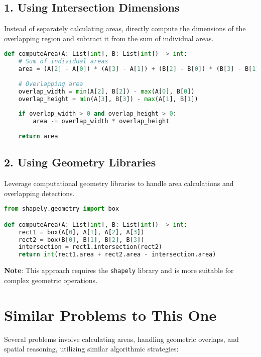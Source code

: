 \subsection*{1. Using Intersection Dimensions}

Instead of separately calculating areas, directly compute the dimensions of the overlapping region and subtract it from the sum of individual areas.

\begin{lstlisting}[language=Python]
def computeArea(A: List[int], B: List[int]) -> int:
    # Sum of individual areas
    area = (A[2] - A[0]) * (A[3] - A[1]) + (B[2] - B[0]) * (B[3] - B[1])
    
    # Overlapping area
    overlap_width = min(A[2], B[2]) - max(A[0], B[0])
    overlap_height = min(A[3], B[3]) - max(A[1], B[1])
    
    if overlap_width > 0 and overlap_height > 0:
        area -= overlap_width * overlap_height
    
    return area
\end{lstlisting}

\subsection*{2. Using Geometry Libraries}

Leverage computational geometry libraries to handle area calculations and overlapping detections.

\begin{lstlisting}[language=Python]
from shapely.geometry import box

def computeArea(A: List[int], B: List[int]) -> int:
    rect1 = box(A[0], A[1], A[2], A[3])
    rect2 = box(B[0], B[1], B[2], B[3])
    intersection = rect1.intersection(rect2)
    return int(rect1.area + rect2.area - intersection.area)
\end{lstlisting}

\textbf{Note}: This approach requires the \texttt{shapely} library and is more suitable for complex geometric operations.

\section*{Similar Problems to This One}

Several problems involve calculating areas, handling geometric overlaps, and spatial reasoning, utilizing similar algorithmic strategies:

